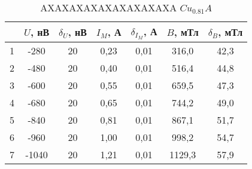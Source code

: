 \begin{table}
\centering
\caption{AXAXAXAXAXAXAXAXAXA $Cu_0.81A$}
\begin{tabular}{|c|c|c|c|c|c|c|}
\hline
 & $U$, нВ & $\delta_U$, нВ & $I_M$, А & $\delta_{I_M}$, А & $B$, мТл & $\delta_B$, мТл \\
\hline
1 & -280 & 20 & 0,23 & 0,01 & 316,0 & 42,3 \\
\cline{1-7}
2 & -480 & 20 & 0,40 & 0,01 & 516,4 & 44,8 \\
\cline{1-7}
3 & -600 & 20 & 0,55 & 0,01 & 659,5 & 47,3 \\
\cline{1-7}
4 & -680 & 20 & 0,65 & 0,01 & 744,2 & 49,0 \\
\cline{1-7}
5 & -840 & 20 & 0,81 & 0,01 & 867,1 & 51,7 \\
\cline{1-7}
6 & -960 & 20 & 1,00 & 0,01 & 998,2 & 54,7 \\
\cline{1-7}
7 & -1040 & 20 & 1,21 & 0,01 & 1129,3 & 57,9 \\
\cline{1-7}
\hline
\end{tabular}
\end{table}
